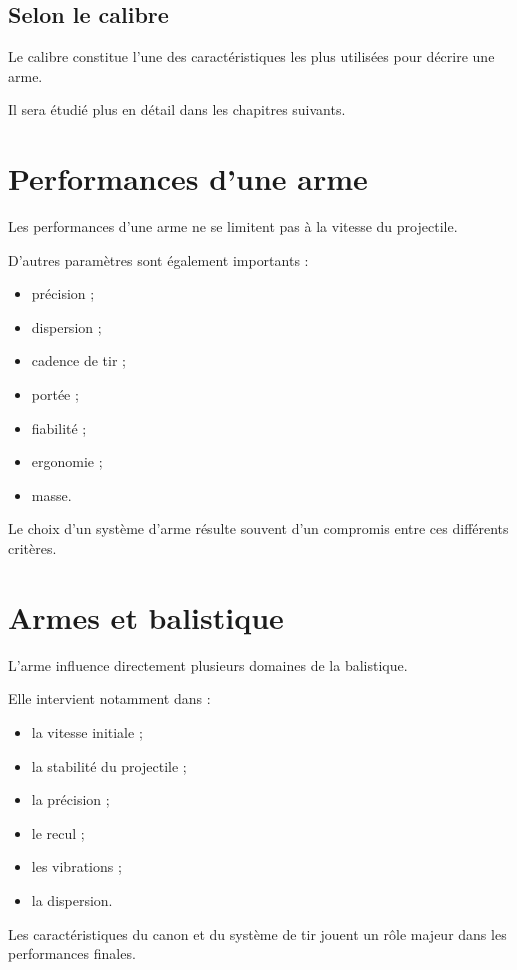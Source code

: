 \subsection{Selon le calibre}

Le calibre constitue l'une des caractéristiques les plus utilisées pour
décrire une arme.

Il sera étudié plus en détail dans les chapitres suivants.

\section{Performances d'une arme}

Les performances d'une arme ne se limitent pas à la vitesse du projectile.

D'autres paramètres sont également importants :

\begin{itemize}
    \item précision ;
    \item dispersion ;
    \item cadence de tir ;
    \item portée ;
    \item fiabilité ;
    \item ergonomie ;
    \item masse.
\end{itemize}

Le choix d'un système d'arme résulte souvent d'un compromis entre ces
différents critères.

\section{Armes et balistique}

L'arme influence directement plusieurs domaines de la balistique.

Elle intervient notamment dans :

\begin{itemize}
    \item la vitesse initiale ;
    \item la stabilité du projectile ;
    \item la précision ;
    \item le recul ;
    \item les vibrations ;
    \item la dispersion.
\end{itemize}

Les caractéristiques du canon et du système de tir jouent un rôle majeur
dans les performances finales.

